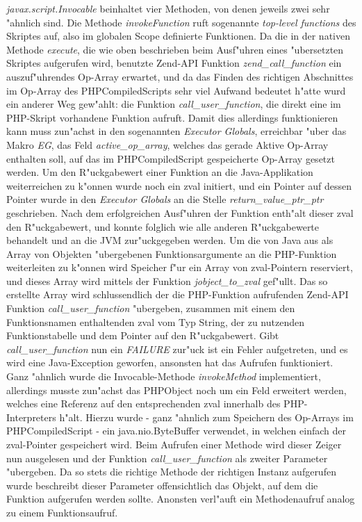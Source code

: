 \emph{javax.script.Invocable} beinhaltet vier Methoden, von denen jeweils zwei sehr "ahnlich sind. Die Methode \emph{invokeFunction} ruft sogenannte \emph{top-level functions}
des Skriptes auf, also im globalen Scope definierte Funktionen. Da die in der nativen Methode \emph{execute}, die wie oben beschrieben beim Ausf"uhren 
eines "ubersetzten Skriptes aufgerufen wird, benutzte Zend-API Funktion \emph{zend\_call\_function} ein auszuf"uhrendes Op-Array erwartet, und da das Finden des
richtigen Abschnittes im Op-Array des PHPCompiledScripts sehr viel Aufwand bedeutet h"atte wurd ein anderer Weg gew"ahlt: die Funktion \emph{call\_user\_function}, die
direkt eine im PHP-Skript vorhandene Funktion aufruft. Damit dies allerdings funktionieren kann muss zun"achst in den sogenannten \emph{Executor Globals}, erreichbar
"uber das Makro \emph{EG}, das Feld \emph{active\_op\_array}, welches das gerade Aktive Op-Array enthalten soll, auf das im PHPCompiledScript gespeicherte
Op-Array gesetzt werden.
Um den R"uckgabewert einer Funktion an die Java-Applikation weiterreichen zu k"onnen wurde noch ein zval initiert, und ein Pointer auf dessen Pointer wurde in den 
\emph{Executor Globals} an die Stelle \emph{return\_value\_ptr\_ptr} geschrieben. Nach dem erfolgreichen Ausf"uhren der Funktion enth"alt dieser zval den R"uckgabewert,
und konnte folglich wie alle anderen R"uckgabewerte behandelt und an die JVM zur"uckgegeben werden.
Um die von Java aus als Array von Objekten "ubergebenen Funktionsargumente an die PHP-Funktion weiterleiten zu k"onnen wird Speicher f"ur ein Array
von zval-Pointern reserviert, und dieses Array wird mittels der Funktion \emph{jobject\_to\_zval} gef"ullt. Das so erstellte Array wird schlussendlich der die PHP-Funktion
aufrufenden Zend-API Funktion \emph{call\_user\_function} "ubergeben, zusammen mit einem den Funktionsnamen enthaltenden zval vom Typ String, der zu nutzenden 
Funktionstabelle und dem Pointer auf den R"uckgabewert. Gibt \emph{call\_user\_function} nun ein \emph{FAILURE} zur"uck ist ein Fehler aufgetreten, und es wird
eine Java-Exception geworfen, ansonsten hat das Aufrufen funktioniert.
Ganz "ahnlich wurde die Invocable-Methode \emph{invokeMethod} implementiert, allerdings musste zun"achst das PHPObject noch um ein Feld erweitert werden, welches
eine Referenz auf den entsprechenden zval innerhalb des PHP-Interpreters h"alt. Hierzu wurde - ganz "ahnlich zum Speichern des Op-Arrays im PHPCompiledScript -
ein java.nio.ByteBuffer verwendet, in welchen einfach der zval-Pointer gespeichert wird. Beim Aufrufen einer Methode wird dieser Zeiger nun ausgelesen und
der Funktion \emph{call\_user\_function} als zweiter Parameter "ubergeben. Da so stets die richtige Methode der richtigen Instanz aufgerufen wurde
beschreibt dieser Parameter offensichtlich das Objekt, auf dem die Funktion aufgerufen werden sollte. Anonsten verl"auft ein Methodenaufruf analog
zu einem Funktionsaufruf.


